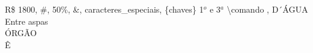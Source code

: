 \documentclass{article}
\begin{document}


R\$ 1800, \#, 50\%, \&, caracteres\_especiais, \{chaves\} 1$^o$ e 3$^a$ \textbackslash comando  , D´ÁGUA  Entre aspas \\ÓRGÃO \\Ê \\
\end{document}
